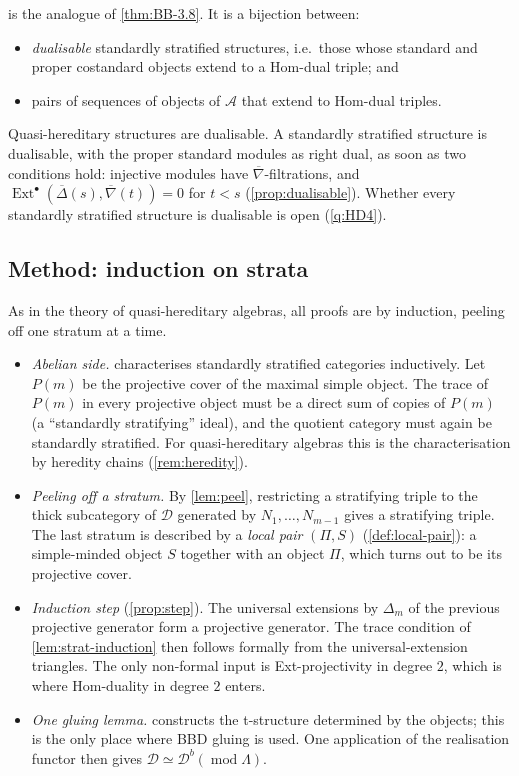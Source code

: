 \documentclass[11pt,reqno]{amsart}
\theoremstyle{plain}
\theoremstyle{definition}
\theoremstyle{remark}
\DeclareMathOperator{\Ext}{Ext}
\newcommand{\modd}{\operatorname{mod}}
\newcommand{\Db}{\mathcal{D}^b}
\newcommand{\nablabar}{\overline{\nabla}}
\newcommand{\Deltabar}{\overline{\Delta}}
\newcommand{\cD}{\mathcal{D}}
\newcommand{\cA}{\mathcal{A}}
\begin{document}
 is the analogue of \cref{thm:BB-3.8}. It is a bijection between:
\begin{itemize}
\item \emph{dualisable} standardly stratified structures, i.e.\ those whose standard and proper costandard objects extend to a Hom-dual triple; and
\item pairs of sequences of objects of $\cA$ that extend to Hom-dual triples.
\end{itemize}
Quasi-hereditary structures are dualisable. A standardly stratified structure is dualisable, with the proper standard modules as right dual, as soon as two conditions hold: injective modules have $\nablabar$-filtrations, and $\Ext^\bullet(\Deltabar(s),\nablabar(t))=0$ for $t<s$ (\cref{prop:dualisable}). Whether every standardly stratified structure is dualisable is open (\cref{q:HD4}).

\subsection{Method: induction on strata}
As in the theory of quasi-hereditary algebras, all proofs are by induction, peeling off one stratum at a time.
\begin{itemize}
\item \emph{Abelian side.}  characterises standardly stratified categories inductively. Let $P(m)$ be the projective cover of the maximal simple object. The trace of $P(m)$ in every projective object must be a direct sum of copies of $P(m)$ (a ``standardly stratifying'' ideal), and the quotient category must again be standardly stratified. For quasi-hereditary algebras this is the characterisation by heredity chains (\cref{rem:heredity}).
\item \emph{Peeling off a stratum.} By \cref{lem:peel}, restricting a stratifying triple to the thick subcategory of $\cD$ generated by $N_1,\dots,N_{m-1}$ gives a stratifying triple. The last stratum is described by a \emph{local pair} $(\Pi,S)$ (\cref{def:local-pair}): a simple-minded object $S$ together with an object $\Pi$, which turns out to be its projective cover.
\item \emph{Induction step} (\cref{prop:step}). The universal extensions by $\Delta_m$ of the previous projective generator form a projective generator. The trace condition of \cref{lem:strat-induction} then follows formally from the universal-extension triangles. The only non-formal input is Ext-projectivity in degree $2$, which is where Hom-duality in degree $2$ enters.
\item \emph{One gluing lemma.}  constructs the t-structure determined by the objects; this is the only place where BBD gluing is used. One application of the realisation functor then gives $\cD\simeq\Db(\modd\Lambda)$.
\end{itemize}
\end{document}
